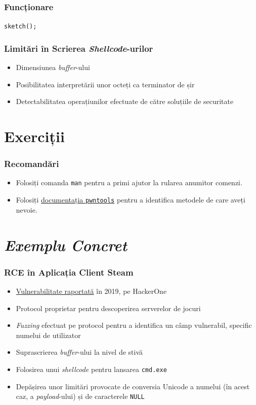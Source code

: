 \documentclass[xcolor={table}]{beamer}
\begin{document}
	\begin{frame}
		\frametitle{Funcționare}\pause
		\centering
        \texttt{sketch();}
	\end{frame}
	
	\begin{frame}
		\frametitle{Limitări în Scrierea \textit{Shellcode}-urilor}\pause
		\begin{itemize}[<+->]
			\item Dimensiunea \textit{buffer}-ului
			\item Posibilitatea interpretării unor octeți ca terminator de șir
			\item Detectabilitatea operațiunilor efectuate de către soluțiile de securitate
		\end{itemize}
	\end{frame}
	
	\section{Exerciții}

	\begin{frame}
		\frametitle{Recomandări}\pause
		\begin{itemize}[<+->]
		    \item Folosiți comanda \texttt{man} pentru a primi ajutor la rularea anumitor comenzi.
		    \item Folosiți \href{https://docs.pwntools.com/en/stable/}{documentația \texttt{pwntools}} pentru a identifica metodele de care aveți nevoie.
	    \end{itemize}
	\end{frame}

	\section{\textit{Exemplu Concret}}

	\begin{frame}
		\frametitle{RCE în Aplicația Client Steam}\pause
		\begin{itemize}[<+->]
		    \item \href{https://hackerone.com/reports/470520}{Vulnerabilitate raportată} în 2019, pe HackerOne
			\item Protocol proprietar pentru descoperirea serverelor de jocuri
			\item \textit{Fuzzing} efectuat pe protocol pentru a identifica un câmp vulnerabil, specific numelui de utilizator
			\item Suprascrierea \textit{buffer}-ului la nivel de stivă
			\item Folosirea unui \textit{shellcode} pentru lansarea \texttt{cmd.exe}
			\item Depășirea unor limitări provocate de conversia Unicode a numelui (în acest caz, a \textit{payload}-ului) și de caracterele \texttt{NULL}
		\end{itemize}
	\end{frame}
	
\end{document}
